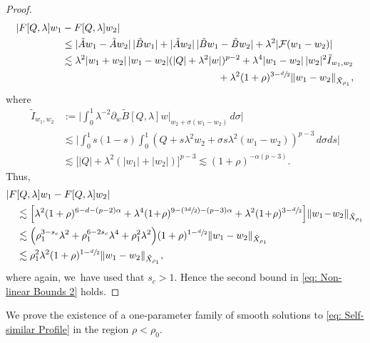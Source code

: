 \documentclass[JEP,XML,SOM,Unicode]{cedram}
\newcommand{\Psfrac}[2]{(\sfrac{#1}{#2})}
\theoremstyle{plain}
\theoremstyle{definition}
\begin{document}
\begin{proof}
\[\begin{aligned}
|F[Q,\lambda]w_1&-F[Q,\lambda]w_2|\\
&\le |\tilde Aw_1-\tilde Aw_2|\,|\tilde Bw_1|+|\tilde Aw_2|\, |\tilde Bw_1-\tilde Bw_2|+\lambda^2|\mathcal F(w_1-w_2)|\\
&\lesssim \lambda^2|w_1+w_2|\,|w_1-w_2|(|Q|+\lambda^2|w|)^{p-2}+\lambda^4|w_1-w_2|\, |w_2|^2\tilde I_{w_1,w_2}\\
&\hspace*{5.5cm}+\lambda^2(1+\rho)^{3-\sfrac{d}{2}}\Vert w_1-w_2\Vert_{\tilde X_{\rho_1}},
\end{aligned}
\]
where
\[
\begin{aligned}
\tilde I_{w_1,w_2}&:=\bigg|\int_0^1\lambda^{-2}\partial_w \tilde B[Q,\lambda]w|_{w_2+\sigma(w_1-w_2)}\,d\sigma\bigg|\\
&\lesssim \bigg|\int_0^1s(1-s)\int_0^1(Q+s\lambda^2w_2+\sigma s \lambda^2(w_1-w_2))^{p-3}\,d\sigma ds\bigg|\\
&\lesssim \Big[|Q|+\lambda^2(|w_1|+|w_2|)\Big]^{p-3}\lesssim (1+\rho)^{-\alpha(p-3)}.
\end{aligned}
\]
Thus,\vspace*{-3pt}
\[
\begin{aligned}
|F&[Q,\lambda]w_1-F[Q,\lambda]w_2|\\
&\lesssim\Big[\lambda^2 (1+\rho)^{6-d-(p-2)\alpha}+\lambda^4(1\!+\!\rho)^{9-\Psfrac{3d}{2}-(p-3)\alpha}+\lambda^2(1\!+\!\rho)^{3-\sfrac{d}{2}}\Big]\Vert w_1\!-\!w_2\Vert_{\tilde X_{\rho_1}}\\
&\lesssim\Big(\rho_1^{3-s_c}\lambda^2+\rho_1^{6-2s_c}\lambda^4+\rho_1^2\lambda^2\Big)(1+\rho)^{1-\sfrac{d}{2}}\Vert w_1-w_2\Vert_{\tilde X_{\rho_1}}\\
&\lesssim\rho_1^2 \lambda^2(1+\rho)^{1-\sfrac{d}{2}}\Vert w_1-w_2\Vert_{\tilde X_{\rho_1}},
\end{aligned}
\]
where again, we~have used that $s_c>1$. Hence the second bound in \eqref{eq: Non-linear Bounds 2} holds.
\end{proof}

We prove the existence of a one-parameter family of smooth solutions to \eqref{eq: Self-similar Profile} in the region $\rho<\rho_0$.
\end{document}
